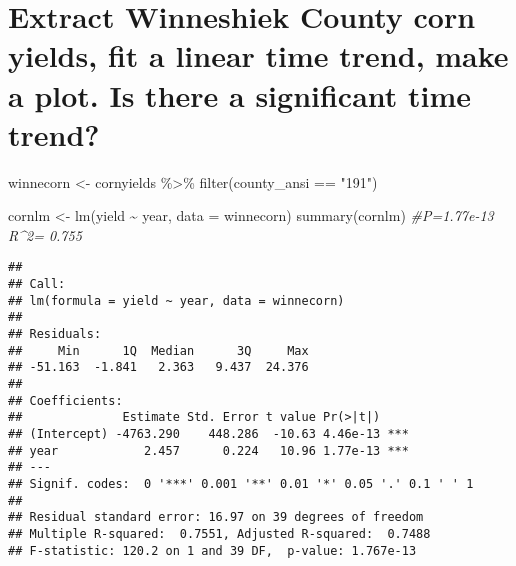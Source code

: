 \documentclass[
]{book}
\newenvironment{Shaded}{\begin{snugshade}}{\end{snugshade}}
\newcommand{\AttributeTok}[1]{\textcolor[rgb]{0.77,0.63,0.00}{#1}}
\newcommand{\CommentTok}[1]{\textcolor[rgb]{0.56,0.35,0.01}{\textit{#1}}}
\newcommand{\FunctionTok}[1]{\textcolor[rgb]{0.00,0.00,0.00}{#1}}
\newcommand{\NormalTok}[1]{#1}
\newcommand{\OtherTok}[1]{\textcolor[rgb]{0.56,0.35,0.01}{#1}}
\newcommand{\SpecialCharTok}[1]{\textcolor[rgb]{0.00,0.00,0.00}{#1}}
\newcommand{\StringTok}[1]{\textcolor[rgb]{0.31,0.60,0.02}{#1}}
\begin{document}
\begin{Shaded}
\end{Shaded}

\hypertarget{extract-winneshiek-county-corn-yields-fit-a-linear-time-trend-make-a-plot.-is-there-a-significant-time-trend}{%
\section{Extract Winneshiek County corn yields, fit a linear time trend, make a plot. Is there a significant time trend?}\label{extract-winneshiek-county-corn-yields-fit-a-linear-time-trend-make-a-plot.-is-there-a-significant-time-trend}}

\begin{Shaded}
\begin{Highlighting}[]
\NormalTok{winnecorn }\OtherTok{\textless{}{-}}\NormalTok{ cornyields }\SpecialCharTok{\%\textgreater{}\%}
  \FunctionTok{filter}\NormalTok{(county\_ansi }\SpecialCharTok{==} \StringTok{"191"}\NormalTok{)}

\NormalTok{cornlm }\OtherTok{\textless{}{-}} \FunctionTok{lm}\NormalTok{(yield }\SpecialCharTok{\textasciitilde{}}\NormalTok{ year, }\AttributeTok{data =}\NormalTok{ winnecorn)}
\FunctionTok{summary}\NormalTok{(cornlm) }\CommentTok{\#P=1.77e{-}13 R\^{}2= 0.755}
\end{Highlighting}
\end{Shaded}

\begin{verbatim}
## 
## Call:
## lm(formula = yield ~ year, data = winnecorn)
## 
## Residuals:
##     Min      1Q  Median      3Q     Max 
## -51.163  -1.841   2.363   9.437  24.376 
## 
## Coefficients:
##              Estimate Std. Error t value Pr(>|t|)    
## (Intercept) -4763.290    448.286  -10.63 4.46e-13 ***
## year            2.457      0.224   10.96 1.77e-13 ***
## ---
## Signif. codes:  0 '***' 0.001 '**' 0.01 '*' 0.05 '.' 0.1 ' ' 1
## 
## Residual standard error: 16.97 on 39 degrees of freedom
## Multiple R-squared:  0.7551, Adjusted R-squared:  0.7488 
## F-statistic: 120.2 on 1 and 39 DF,  p-value: 1.767e-13
\end{verbatim}
\end{document}
